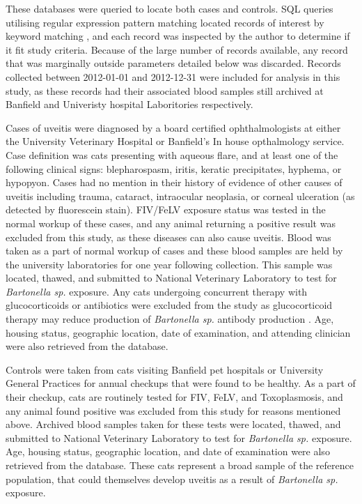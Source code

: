 \documentclass[11pt,twocolumn]{article}
\begin{document}
	These databases were queried to locate both cases and controls. SQL queries utilising regular expression pattern matching located records of interest by keyword matching , and each record was inspected by the author to determine if it fit study criteria. Because of the large number of records available, any record that was marginally outside parameters detailed below was discarded.
	Records collected between 2012-01-01 and 2012-12-31 were included for analysis in this study, as these records had their associated blood samples still archived at Banfield and Univeristy hospital Laboritories respectively.


	Cases of uveitis were diagnosed by a board certified ophthalmologists at either the University Veterinary Hospital or Banfield's In house opthalmology service.
	Case definition was cats presenting with aqueous flare, and at least one of the following clinical signs: blepharospasm, iritis, keratic precipitates, hyphema, or hypopyon. 
	Cases had no mention in their history of evidence of other causes of uveitis including trauma, cataract, intraocular neoplasia, or corneal ulceration (as detected by fluorescein stain). 
	FIV/FeLV exposure status was tested in the normal workup of these cases, and any animal returning a positive result was excluded from this study, as these diseases can also cause uveitis. 
	Blood was taken as a part of normal workup of cases and these blood samples are held by the university laboratories for one year following collection. This sample was located, thawed, and submitted to National Veterinary Laboratory to test for \emph{Bartonella sp.} exposure.
	Any cats undergoing concurrent therapy with glucocorticoids or antibiotics were excluded from the study as glucocorticoid therapy may reduce production of \emph{Bartonella sp.} antibody production \cite{Lappin2000}.
	Age, housing status, geographic location, date of examination, and attending clinician  were also retrieved from the database. 



	Controls were taken from cats visiting Banfield pet hospitals or University General Practices for annual checkups that were found to be healthy. 
	As a part of their checkup, cats are routinely tested for FIV, FeLV, and Toxoplasmosis, and any animal found positive was excluded from this study for reasons mentioned above. 
	Archived blood samples taken for these tests were located, thawed, and submitted to National Veterinary Laboratory to test for \emph{Bartonella sp.} exposure.
	Age, housing status, geographic location, and date of examination were also retrieved from the database. 
	These cats represent a broad sample of the reference population, that could themselves develop uveitis as a result of \emph{Bartonella sp.} exposure.
\end{document}
